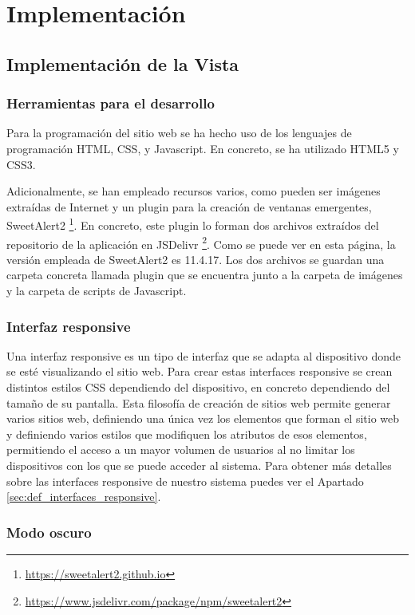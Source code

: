 \chapter{Implementación}

\section{Implementación de la Vista}

\subsection{Herramientas para el desarrollo}

Para la programación del sitio web se ha hecho uso de los lenguajes de programación HTML, CSS, y Javascript. En concreto, se ha utilizado HTML5 y CSS3.

Adicionalmente, se han empleado recursos varios, como pueden ser imágenes extraídas de Internet y un \gls{plugin} para la creación de ventanas emergentes, SweetAlert2 \footnote{\url{https://sweetalert2.github.io}}. En concreto, este \gls{plugin} lo forman dos archivos extraídos del repositorio de la aplicación en JSDelivr \footnote{\url{https://www.jsdelivr.com/package/npm/sweetalert2}}. Como se puede ver en esta página, la versión empleada de SweetAlert2 es 11.4.17. Los dos archivos se guardan una carpeta concreta llamada plugin que se encuentra junto a la carpeta de imágenes y la carpeta de scripts de Javascript.

\subsection{Interfaz responsive}

Una interfaz responsive es un tipo de interfaz que se adapta al dispositivo donde se esté visualizando el sitio web. Para crear estas interfaces responsive se crean distintos estilos CSS dependiendo del dispositivo, en concreto dependiendo del tamaño de su pantalla. Esta filosofía de creación de sitios web permite generar varios sitios web, definiendo una única vez los elementos que forman el sitio web y definiendo varios estilos que modifiquen los atributos de esos elementos, permitiendo el acceso a un mayor volumen de usuarios al no limitar los dispositivos con los que se puede acceder al sistema. Para obtener más detalles sobre las interfaces responsive de nuestro sistema puedes ver el Apartado \ref{sec:def_interfaces_responsive}.

\subsection{Modo oscuro}

